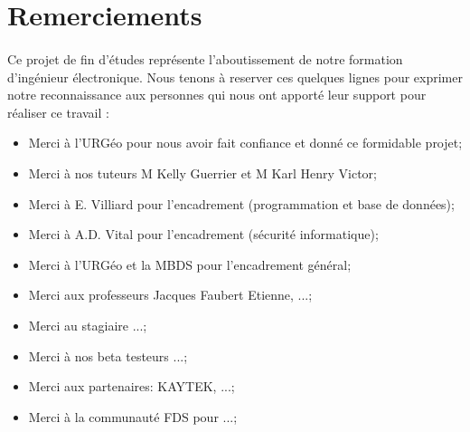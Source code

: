 \section{Remerciements}
\paragraph{}
Ce projet de fin d’études représente l'aboutissement de notre formation d’ingénieur électronique. 
Nous tenons à reserver ces quelques lignes pour exprimer notre
reconnaissance aux personnes qui nous ont apporté leur support pour réaliser ce travail :

\begin{itemize}
    \item Merci à l'URGéo pour nous avoir fait confiance et donné ce formidable projet;\par
    \item Merci à nos tuteurs M Kelly Guerrier et M Karl Henry Victor;\par
    \item Merci à  E. Villiard pour l'encadrement (programmation et base de données);\par
    \item Merci à A.D. Vital pour l'encadrement (sécurité informatique);\par
    \item Merci à l'URGéo et la MBDS pour l'encadrement général;\par
    \item Merci aux professeurs Jacques Faubert Etienne, ...;\par
    \item Merci au stagiaire ...;\par
    \item Merci à nos beta testeurs ...;\par
    \item Merci aux partenaires: KAYTEK, ...;\par
    \item Merci à la communauté FDS pour ...;\par
\end{itemize}
